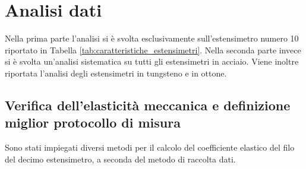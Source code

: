 \documentclass[a4paper,11pt,oneside]{article}
\begin{document}
\section{Analisi dati}
Nella prima parte l'analisi si è svolta esclusivamente sull'estensimetro numero 10 riportato in Tabella \ref{tab:caratteristiche_estensimetri}. Nella seconda parte invece si è svolta un'analisi sistematica su tutti gli estensimetri in acciaio. Viene inoltre riportata l'analisi degli estensimetri in tungsteno e in ottone.

\subsection{Verifica dell'elasticità meccanica e definizione miglior protocollo di misura}\label{sec:prima_parte}
Sono stati impiegati diversi metodi per il calcolo del coefficiente elastico del filo del decimo estensimetro, a seconda del metodo di raccolta dati.\\
\end{document}
